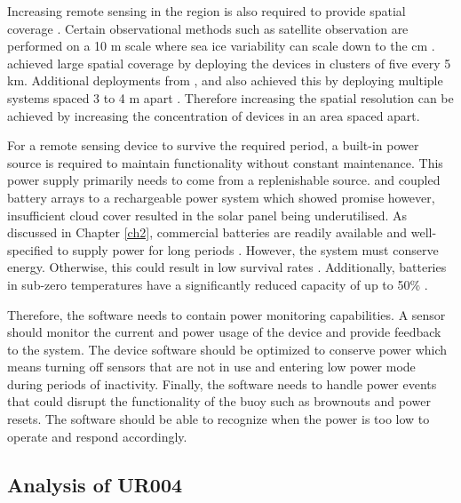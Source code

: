 Increasing remote sensing in the region is also required to provide spatial coverage \cite{albarello2020drift}. Certain observational methods such as satellite observation are performed on a 10 m scale \cite{galin2011validation} where sea ice variability can scale down to the cm \cite{vichi2019effects}. \textcite{doble2017robust} achieved large spatial coverage by deploying the devices in clusters of five every 5 km. Additional deployments from \cite{vichi2019effects}, \cite{kohout2015device} and \cite{albarello2020drift}
also achieved this by deploying multiple systems spaced 3 to 4 m apart \cite{vichi2019effects}. Therefore increasing the spatial resolution can be achieved by increasing the concentration of devices in an area spaced apart. \par 

For a remote sensing device to survive the required period, a built-in power source is required to maintain functionality without constant maintenance. This power supply primarily needs to come from a replenishable source. \textcite{doble2017robust} and \textcite{rabault2019open} coupled battery arrays to a rechargeable power system which showed promise however, insufficient cloud cover \cite{doble2017robust} resulted in the solar panel being underutilised. As discussed in Chapter \ref{ch2}, commercial batteries are readily available and well-specified to supply power for long periods \cite{rabault2017measurements}. However, the system must conserve energy. Otherwise, this could result in low survival rates \cite{kohout2015device}. Additionally, batteries in sub-zero temperatures have a significantly reduced capacity of up to 50\% \cite{doble2017robust}.

Therefore, the software needs to contain power monitoring capabilities. A sensor should monitor the current and power usage of the device and provide feedback to the system. The device software should be optimized to conserve power which means turning off sensors that are not in use and entering low power mode during periods of inactivity. Finally, the software needs to handle power events that could disrupt the functionality of the buoy such as brownouts and power resets. The software should be able to recognize when the power is too low to operate and respond accordingly.

\subsection{Analysis of UR004}

